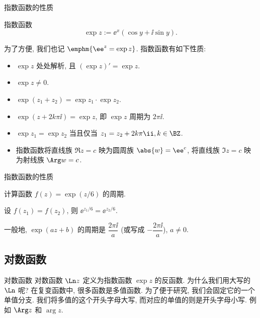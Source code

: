\begin{frame}{指数函数的性质}
	\onslide<+->
	\begin{third}{指数函数}
	\[
		\exp z:=\ee^x(\cos y+\ii\sin y).
	\]
	\end{third}
	\onslide<+->
	为了方便, 我们也记 $\emphm{\ee^z=\exp z}$.
	\onslide<+->
	指数函数有如下性质:
	\begin{itemize}\bf
		\item $\exp z$ 处处解析, 且 $(\exp z)'=\exp z$.
		\item $\exp z\neq 0$.
		\item $\exp(z_1+z_2)=\exp z_1\cdot \exp z_2$.
		\item $\exp(z+2k\pi\ii)=\exp z$, 即 $\exp z$ 周期为 $2\pi\ii$.
		\item $\exp z_1=\exp z_2$ 当且仅当 $z_1=z_2+2k\pi\ii,k\in\BZ$.
		\item 指数函数将直线族 $\Re z=c$ 映为圆周族 $\abs{w}=\ee^c$, 将直线族 $\Im z=c$ 映为射线族 $\Arg w=c$.
	\end{itemize}
\end{frame}


\begin{frame}{指数函数的性质}
	\onslide<+->
	\begin{example}
		计算函数 $f(z)=\exp(z/6)$ 的周期.
	\end{example}

	\onslide<+->
	\begin{solution}
		设 $f(z_1)=f(z_2)$, 则 $\ee^{z_1/6}=\ee^{z_2/6}$.
		\onslide<+->{%
			所以 $f(z)$ 的周期是 $12\pi\ii$.
		}
	\end{solution}

	\onslide<+->
	一般地, $\exp(az+b)$ 的周期是 $\dfrac{2\pi\ii}a$ (或写成 $-\dfrac{2\pi\ii}a$), $a\neq 0$.
\end{frame}


\subsection{对数函数}

\begin{frame}{对数函数}
	\onslide<+->
	对数函数 $\Ln z$ 定义为指数函数 $\exp z$ 的反函数.
	\onslide<+->
	为什么我们用大写的 $\Ln$ 呢? 
	\onslide<+->
	在复变函数中, 很多函数是多值函数.
	\onslide<+->
	为了便于研究, 我们会固定它的一个单值分支.
	\onslide<+->
	我们将多值的这个开头字母大写, 而对应的单值的则是开头字母小写.
	\onslide<+->
	例如 $\Arg z$ 和 $\arg z$.
\end{frame}


